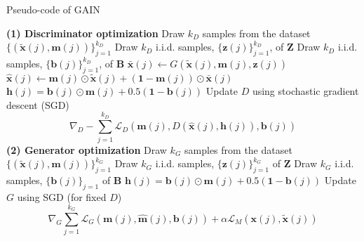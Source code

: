 \documentclass{article}
\begin{document}
\begin{algorithm}[h!]
	\caption{Pseudo-code of GAIN}\label{alg:pseudo}
	\begin{algorithmic} 
		\STATE \textbf{(1) Discriminator optimization} 
		\STATE Draw $k_D$ samples from the dataset $\{(\tilde{\mathbf{x}}(j), \mathbf{m}(j))\}_{j=1}^{k_D}$
		\STATE Draw $k_D$ i.i.d. samples, $\{\mathbf{z}(j)\}_{j=1}^{k_D}$, of $\mathbf{Z}$
		\STATE Draw $k_D$ i.i.d. samples, $\{\mathbf{b}(j)\}_{j=1}^{k_D}$, of $\mathbf{B}$
		\STATE $\bar{\mathbf{x}}(j) \gets G(\tilde{\mathbf{x}}(j), \mathbf{m}(j), \mathbf{z}(j))$
		\STATE $\hat{\mathbf{x}}(j) \gets \mathbf{m}(j) \odot \tilde{\mathbf{x}}(j) + (\mathbf{1 - m}(j)) \odot \bar{\mathbf{x}}(j)$
		\STATE $\mathbf{h}(j) = \mathbf{b}(j) \odot \mathbf{m}(j) + 0.5(\mathbf{1 - b}(j))$
		\ENDFOR
		\STATE Update $D$ using stochastic gradient descent (SGD) 
		\begin{equation*}
		\nabla_{D}-\sum_{j=1}^{k_D} \mathcal{L}_D(\mathbf{m}(j), D(\hat{\mathbf{x}}(j), \mathbf{h}(j)), \mathbf{b}(j))
		\end{equation*}
		\STATE \textbf{(2) Generator optimization} 
		\STATE Draw $k_G$ samples from the dataset $\{(\tilde{\mathbf{x}}(j), \mathbf{m}(j))\}_{j=1}^{k_G}$
		\STATE Draw $k_G$ i.i.d. samples, $\{\mathbf{z}(j)\}_{j=1}^{k_G}$ of $\mathbf{Z}$
		\STATE Draw $k_G$ i.i.d. samples, $\{\mathbf{b}(j)\}_{j=1}$ of $\mathbf{B}$
		\STATE $\mathbf{h}(j) = \mathbf{b}(j) \odot \mathbf{m}(j) + 0.5(\mathbf{1 - b}(j))$
		\ENDFOR
		\STATE Update $G$ using SGD (for fixed $D$) 
		\[
		\nabla_{G}\sum_{j=1}^{k_{G}}\mathcal{L}_{G}(\mathbf{m}(j),\hat{\mathbf{m}}(j), \mathbf{b}(j))+\alpha\mathcal{L}_{M}(\mathbf{x}(j),\tilde{\mathbf{x}}(j))
		\]
		\ENDWHILE
	\end{algorithmic} 
\end{algorithm}
\end{document}
